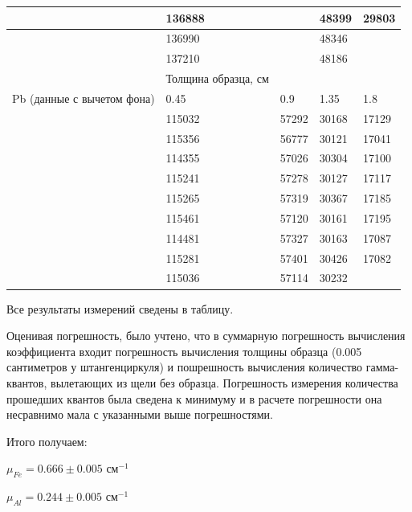 \documentclass[%
reprint,
amsmath,amssymb,
aps,
]{revtex4-2}
\begin{document}
\begin{table}[]
\begin{tabular}{|l|l|l|l|l|}
			& 136888              &                  & 48399            & 29803 \\ \hline
			& 136990              &                  & 48346            &       \\ \hline
			& 137210              &                  & 48186            &       \\ \hline
			& Толщина образца, см &                  &                  &       \\ \hline
			Pb (данные с вычетом фона) & 0.45                & 0.9              & 1.35             & 1.8   \\ \hline
			& 115032              & 57292            & 30168            & 17129 \\ \hline
			& 115356              & 56777            & 30121            & 17041 \\ \hline
			& 114355              & 57026            & 30304            & 17100 \\ \hline
			& 115241              & 57278            & 30127            & 17117 \\ \hline
			& 115265              & 57319            & 30367            & 17185 \\ \hline
			& 115461              & 57120            & 30161            & 17195 \\ \hline
			& 114481              & 57327            & 30163            & 17087 \\ \hline
			& 115281              & 57401            & 30426            & 17082 \\ \hline
			& 115036              & 57114            & 30232            &    \\ \hline
		\end{tabular}
	\end{table}




	Все результаты измерений сведены в таблицу. 
	
	Оценивая погрешность, было учтено, что в суммарную погрешность вычисления коэффициента входит погрешность вычисления толщины образца (0.005 сантиметров у штангенциркуля) и пошрешность вычисления количество гамма-квантов, вылетающих из щели без образца. Погрешность измерения количества прошедших квантов была сведена к минимуму и в расчете погрешности она несравнимо мала с указанными выше погрешностями.
	
	Итого получаем: 
	
	$\mu_{Fe} = 0.666 \pm 0.005 \text{ см}^{-1}$
	
	
	 $\mu_{Al} = 0.244 \pm 0.005 \text{ см}^{-1}$
	 
\end{document}
